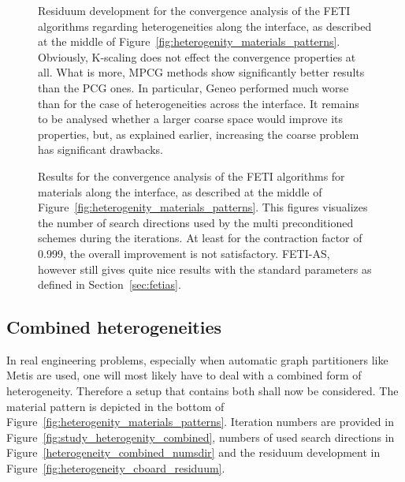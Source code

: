 \begin{figure}
  \begin{center}
    
    \caption[Study of heterogeneities along the interface: residua]{Residuum development for the convergence analysis of the FETI algorithms regarding heterogeneities along the interface, as described at the middle of Figure~\ref{fig:heterogenity_materials_patterns}. Obviously, K-scaling does not effect the convergence properties at all. What is more, MPCG methods show significantly better results than the PCG ones. In particular, Geneo performed much worse than for the case of heterogeneities across the interface. It remains to be analysed whether a larger coarse space would improve its properties, but, as explained earlier, increasing the coarse problem has significant drawbacks. }
    \label{fig:heterogeneity_along_residuum}
  \end{center}
\end{figure}

\begin{figure}
  \begin{center}
    
    \caption[Study of heterogeneities across the interface: \# search directions]{Results for the convergence analysis of the FETI algorithms for materials along the interface, as described at the middle of Figure~\ref{fig:heterogenity_materials_patterns}. This figures visualizes the number of search directions used by the multi preconditioned schemes during the iterations. At least for the contraction factor of 0.999, the overall improvement is not satisfactory. FETI-AS, however still gives quite nice results with the standard parameters as defined in Section~\ref{sec:fetias}. }
    \label{fig:heterogeneity_along_numsdir}
  \end{center}
\end{figure}





\FloatBarrier
\subsection{Combined heterogeneities}\label{sec:heterogeneities_combined}
In real engineering problems, especially when automatic graph partitioners like Metis are used, one will most likely have to deal with a combined form of heterogeneity. Therefore a setup that contains both shall now be considered. The material pattern is depicted in the bottom of Figure~\ref{fig:heterogenity_materials_patterns}. Iteration numbers are provided in Figure~\ref{fig:study_heterogenity_combined}, numbers of used search directions in Figure~\ref{heterogeneity_combined_numsdir} and the residuum development in Figure~\ref{fig:heterogeneity_cboard_residuum}.


